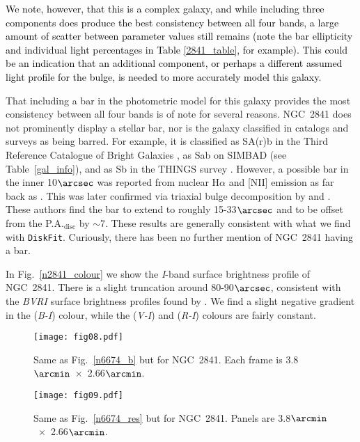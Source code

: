 \documentclass[a4paper,fleqn,usenatbib]{mnras}
\newcommand{\authorfix}{\textcolor{black}}
\begin{document}
\authorfix{We note, however, that this is a complex galaxy, and while including three components does produce the best consistency between all four bands, a large amount of scatter between parameter values still remains (note the bar ellipticity and individual light percentages in Table \ref{2841_table}, for example). This could be an indication that an additional component, or perhaps a different assumed light profile for the bulge, is needed to more accurately model this galaxy.}

That including a bar in the photometric model for this galaxy provides the most consistency between all four bands is of note for several reasons. NGC~2841 does not prominently display a stellar bar, nor is the galaxy classified in catalogs and surveys as being barred. For example, it is classified as SA(r)b in the Third Reference Catalogue of Bright Galaxies \citep{deVaucouleurs1991}, as Sab on SIMBAD (see Table~\ref{gal_info}), and as Sb in the THINGS survey \citep{walter2008}. However, a possible bar in the inner 10$\arcsec$ was reported from nuclear H$\alpha$ and [NII] emission  as far back as \citet{keel1983}. This was later confirmed via triaxial bulge decomposition by \citet{varela1996} and \citet{afanasiev1999}. These authors find the bar to extend to roughly 15-33$\arcsec$ and to be offset from the P.A.$_{\mathrm{disc}}$ by $\sim$7\degr. These results are generally consistent with what we find with \texttt{DiskFit}. Curiously, there has been no further mention of NGC~2841 having a bar.

In Fig.~\ref{n2841_colour} we show the \textit{I}-band surface brightness profile of NGC~2841. There is a slight truncation around 80-90$\arcsec$, consistent with the \textit{BVRI} surface brightness profiles found by \citet{marci2001}. We find a slight negative gradient in the (\textit{B-I}) colour, while the (\textit{V-I}) and (\textit{R-I}) colours are fairly constant.

\begin{figure*}
	\center
	\texttt{[image: fig08.pdf]}
  	\caption{Same as Fig.~\ref{n6674_b} but for NGC~2841. Each frame is 3.8$\arcmin$~$\times$~2.66$\arcmin$.}
  	\label{n2841_b}
\end{figure*}

\begin{figure}
	\center
	\texttt{[image: fig09.pdf]}
	\caption{Same as Fig.~\ref{n6674_res} but for NGC~2841. Panels are 3.8$\arcmin$~$\times$~2.66$\arcmin$.}
	\label{n2841_res}
\end{figure}
\end{document}

